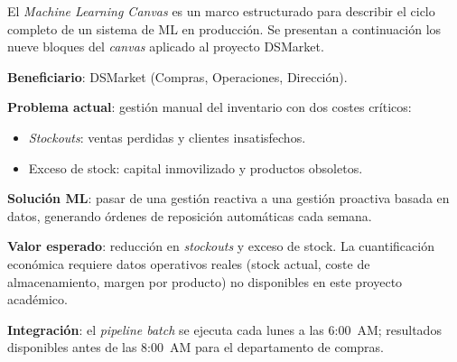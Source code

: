 \documentclass[12pt, a4paper, oneside]{report}
\begin{document}
\vspace{0.4cm}
\noindent El \textit{Machine Learning Canvas} es un marco estructurado para describir el ciclo completo de un sistema de ML en producci\'on. Se presentan a continuaci\'on los nueve bloques del \textit{canvas} aplicado al proyecto DSMarket.

\vspace{0.5cm}

\begin{tcolorbox}[canvasbox, title={1.\ Value Proposition}]
\textbf{Beneficiario}: DSMarket (Compras, Operaciones, Direcci\'on).

\medskip
\textbf{Problema actual}: gesti\'on manual del inventario con dos costes cr\'iticos:
\begin{itemize}[noitemsep, leftmargin=*]
  \item \textit{Stockouts}: ventas perdidas y clientes insatisfechos.
  \item Exceso de stock: capital inmovilizado y productos obsoletos.
\end{itemize}

\medskip
\textbf{Soluci\'on ML}: pasar de una gesti\'on reactiva a una gesti\'on proactiva basada en datos, generando \'ordenes de reposici\'on autom\'aticas cada semana.

\medskip
\textbf{Valor esperado}: reducci\'on en \textit{stockouts} y exceso de stock. La cuantificaci\'on econ\'omica requiere datos operativos reales (stock actual, coste de almacenamiento, margen por producto) no disponibles en este proyecto acad\'emico.

\medskip
\textbf{Integraci\'on}: el \textit{pipeline batch} se ejecuta cada lunes a las 6:00~AM; resultados disponibles antes de las 8:00~AM para el departamento de compras.
\end{tcolorbox}

\vspace{0.4cm}
\end{document}
